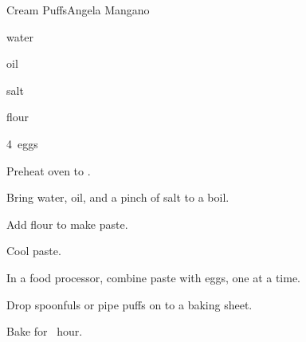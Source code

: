 \begin{recipe}{Cream Puffs}{Angela Mangano}{}

\begin{ingredients}
\item {} water
\item \C{\half} oil
\item salt
\item {} flour
\item 4~eggs
\end{ingredients}

\begin{directions}
\item Preheat oven to .
\item Bring water, oil, and a pinch of salt to a boil.
\item Add flour to make paste.
\item Cool paste.
\item In a food processor, combine paste with eggs, one at a time.
\item Drop spoonfuls or pipe puffs on to a baking sheet.
\item Bake for \half~hour.
\end{directions}

\end{recipe}
